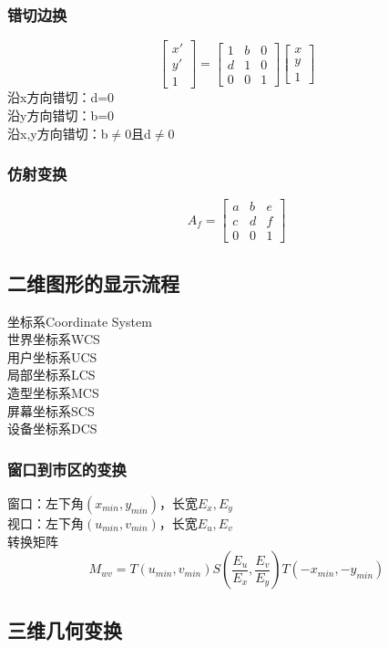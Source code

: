 \documentclass{article}
\begin{document}
\begin{CJK}{UTF8}{gbsn}
	\subsubsection{错切边换}
	$$\begin{bmatrix}
	x'\\y'\\1	
	\end{bmatrix}=\begin{bmatrix}
	1&b&0\\d&1&0\\0&0&1
	\end{bmatrix}
	\begin{bmatrix}
	x\\y\\1
	\end{bmatrix}
	$$
	沿x方向错切：d=0\\
	沿y方向错切：b=0\\
	沿x,y方向错切：b$\neq$0且d$\neq$0\\
	\subsubsection{仿射变换}
	$$
	A_f=
	\begin{bmatrix}
	a&b&e\\c&d&f\\0&0&1
	\end{bmatrix}
	$$
	\subsection{二维图形的显示流程}
	坐标系Coordinate System\\
	世界坐标系WCS\\
	用户坐标系UCS\\
	局部坐标系LCS\\
	造型坐标系MCS\\
	屏幕坐标系SCS\\
	设备坐标系DCS\\
	\subsubsection{窗口到市区的变换}
	窗口：左下角$(x_{min},y_{min})$，长宽$E_x,E_y$\\
	视口：左下角$(u_{min},v_{min})$，长宽$E_u,E_v$\\
	转换矩阵\\
	$$
	M_{wv}=T(u_{min},v_{min})S(\frac{E_u}{E_x},\frac{E_v}{E_y})T(-x_{min},-y_{min})
	$$
	\subsection{三维几何变换}

\end{CJK}
\end{document}
